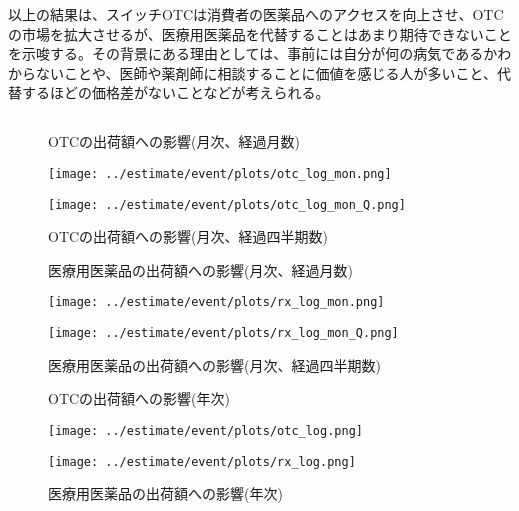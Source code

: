 \documentclass[a4paper,11pt,uplatex]{jsarticle}
\theoremstyle{definition}
\begin{document}
以上の結果は、スイッチOTCは消費者の医薬品へのアクセスを向上させ、OTCの市場を拡大させるが、医療用医薬品を代替することはあまり期待できないことを示唆する。その背景にある理由としては、事前には自分が何の病気であるかわからないことや、医師や薬剤師に相談することに価値を感じる人が多いこと、代替するほどの価格差がないことなどが考えられる。


\begin{appendices}
    \def\thesection{付録\Alph{section}}
    \section{}\label{event_graph}
    \begin{figure}[H]
        \centering
        \begin{minipage}{0.45\textwidth}
            \caption{OTCの出荷額への影響(月次、経過月数)}
            \centering
            \texttt{[image: ../estimate/event/plots/otc\_log\_mon.png]}
            \end{minipage}\hfill
        \begin{minipage}{0.45\textwidth}
            \caption{OTCの出荷額への影響(月次、経過四半期数)}
            \centering
            \texttt{[image: ../estimate/event/plots/otc\_log\_mon\_Q.png]}
        \end{minipage}
    \end{figure}
    \begin{figure}[H]
        \centering
        \begin{minipage}{0.45\textwidth}
            \caption{医療用医薬品の出荷額への影響(月次、経過月数)}
            \centering
            \texttt{[image: ../estimate/event/plots/rx\_log\_mon.png]}
            \end{minipage}\hfill
        \begin{minipage}{0.45\textwidth}
            \caption{医療用医薬品の出荷額への影響(月次、経過四半期数)}
            \centering
            \texttt{[image: ../estimate/event/plots/rx\_log\_mon\_Q.png]}
        \end{minipage}
    \end{figure}
    \begin{figure}[H]
        \centering
        \begin{minipage}{0.45\textwidth}
            \caption{OTCの出荷額への影響(年次)}
            \centering
            \texttt{[image: ../estimate/event/plots/otc\_log.png]}
        \end{minipage}\hfill
        \begin{minipage}{0.45\textwidth}
            \caption{医療用医薬品の出荷額への影響(年次)}
            \centering
            \texttt{[image: ../estimate/event/plots/rx\_log.png]}
        \end{minipage}
    \end{figure}

\end{appendices}
\end{document}
